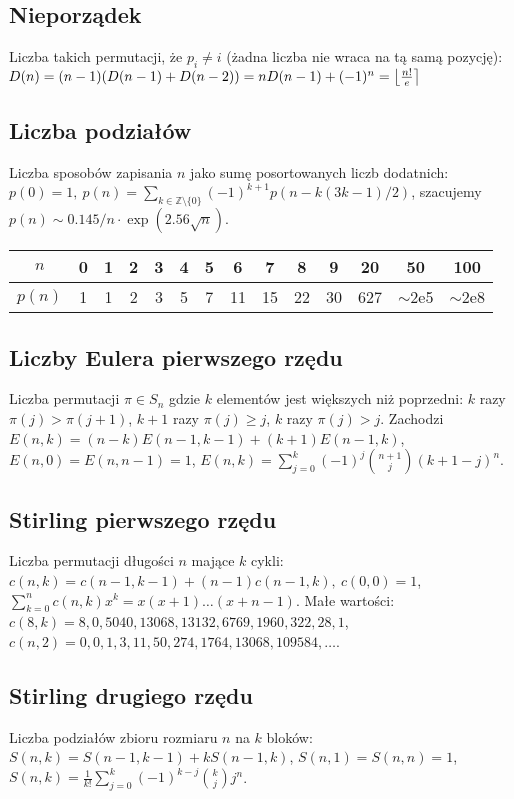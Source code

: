 	\subsection{Nieporządek}
		Liczba takich permutacji, że $p_i \neq i$ (żadna liczba nie wraca na tą samą pozycję):
		$ \mkern-2mu D(n) = (n-1)(D(n-1)+D(n-2)) = n D(n-1)+(-1)^n = \left\lfloor\frac{n!}{e}\right\rceil $

	\subsection{Liczba podziałów}
		Liczba sposobów zapisania $n$ jako sumę posortowanych liczb dodatnich:
		$ p(0) = 1,\ p(n) = \sum_{k \in \mathbb Z \setminus \{0\}}{(-1)^{k+1} p(n - k(3k-1) / 2)} $,
		szacujemy $ p(n) \sim 0.145 / n \cdot \exp(2.56 \sqrt{n}) $.

		\begin{center}
		\begin{tabular}{c|c@{\ }c@{\ }c@{\ }c@{\ }c@{\ }c@{\ }c@{\ }c@{\ }c@{\ }c@{\ }c@{\ }c@{\ }c}
			$n$    & 0 & 1 & 2 & 3 & 4 & 5 & 6  & 7  & 8  & 9  & 20  & 50  & 100 \\ \hline
			$p(n)$ & 1 & 1 & 2 & 3 & 5 & 7 & 11 & 15 & 22 & 30 & 627 & $\mathtt{\sim}$2e5 & $\mathtt{\sim}$2e8 \\
		\end{tabular}
		\end{center}

	\subsection{Liczby Eulera pierwszego rzędu}
		Liczba permutacji $\pi \in S_n$ gdzie $k$ elementów jest większych niż poprzedni: $k$ razy $\pi(j)>\pi(j+1)$, $k+1$ razy $\pi(j)\geq j$, $k$ razy $\pi(j)>j$.
		Zachodzi
		$E(n,k) = (n-k)E(n-1,k-1) + (k+1)E(n-1,k)$,
		$E(n,0) = E(n,n-1) = 1$,
		$E(n,k) = \sum_{j=0}^k(-1)^j\binom{n+1}{j}(k+1-j)^n$.

	\subsection{Stirling pierwszego rzędu}
		Liczba permutacji długości $n$ mające $k$ cykli:
			$c(n,k) = c(n-1,k-1) + (n-1) c(n-1,k),\ c(0,0) = 1$,
			$\textstyle \sum_{k=0}^n c(n,k)x^k = x(x+1) \dots (x+n-1)$.
		Małe wartości:
		$c(8,k) = 8, 0, 5040, 13068, 13132, 6769, 1960, 322, 28, 1$,
		$c(n,2) = 0, 0, 1, 3, 11, 50, 274, 1764, 13068, 109584, \dots$.

	\subsection{Stirling drugiego rzędu}
		Liczba podziałów zbioru rozmiaru $n$ na $k$ bloków:
		$S(n,k) = S(n-1,k-1) + k S(n-1,k)$,
		$S(n,1) = S(n,n) = 1$,
		$S(n,k) = \frac{1}{k!}\sum_{j=0}^k (-1)^{k-j}\binom{k}{j}j^n$.

